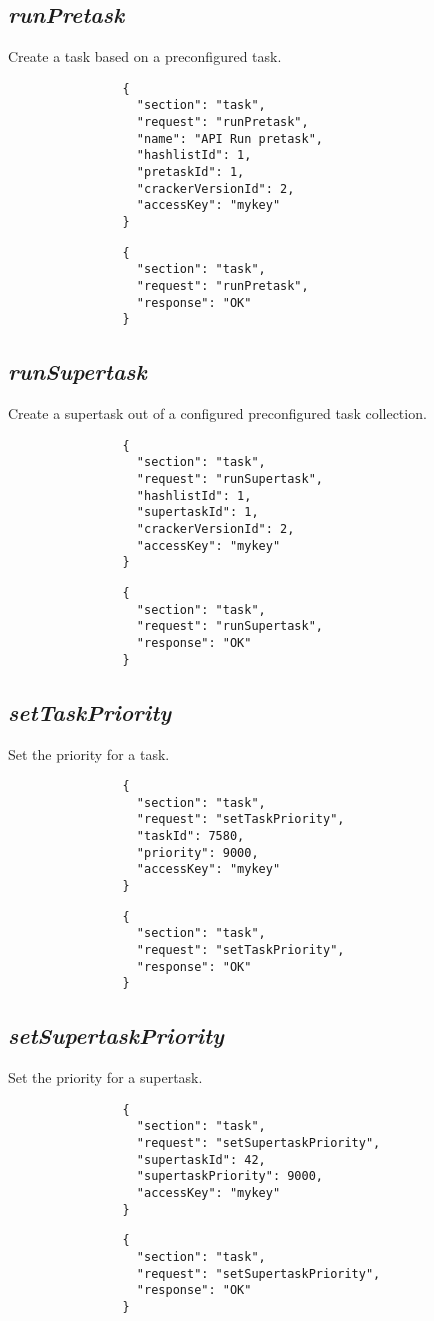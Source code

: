 		\subsection*{\textit{runPretask}}
			Create a task based on a preconfigured task.
			{
				\color{blue}
				\begin{verbatim}
				{
				  "section": "task",
				  "request": "runPretask",
				  "name": "API Run pretask",
				  "hashlistId": 1,
				  "pretaskId": 1,
				  "crackerVersionId": 2,
				  "accessKey": "mykey"
				}
				\end{verbatim}
			}
			{
				\color{OliveGreen}
				\begin{verbatim}
				{
				  "section": "task",
				  "request": "runPretask",
				  "response": "OK"
				}
				\end{verbatim}
			}		
		\subsection*{\textit{runSupertask}}
			Create a supertask out of a configured preconfigured task collection.
			{
				\color{blue}
				\begin{verbatim}
				{
				  "section": "task",
				  "request": "runSupertask",
				  "hashlistId": 1,
				  "supertaskId": 1,
				  "crackerVersionId": 2,
				  "accessKey": "mykey"
				}
				\end{verbatim}
			}
			{
				\color{OliveGreen}
				\begin{verbatim}
				{
				  "section": "task",
				  "request": "runSupertask",
				  "response": "OK"
				}
				\end{verbatim}
			}	
		\subsection*{\textit{setTaskPriority}}
			Set the priority for a task.
			{
				\color{blue}
				\begin{verbatim}
				{
				  "section": "task",
				  "request": "setTaskPriority",
				  "taskId": 7580,
				  "priority": 9000,
				  "accessKey": "mykey"
				}
				\end{verbatim}
			}
			{
				\color{OliveGreen}
				\begin{verbatim}
				{
				  "section": "task",
				  "request": "setTaskPriority",
				  "response": "OK"
				}
				\end{verbatim}
			}		
		\subsection*{\textit{setSupertaskPriority}}
			Set the priority for a supertask.
			{
				\color{blue}
				\begin{verbatim}
				{
				  "section": "task",
				  "request": "setSupertaskPriority",
				  "supertaskId": 42,
				  "supertaskPriority": 9000,
				  "accessKey": "mykey"
				}
				\end{verbatim}
			}
			{
				\color{OliveGreen}
				\begin{verbatim}
				{
				  "section": "task",
				  "request": "setSupertaskPriority",
				  "response": "OK"
				}
				\end{verbatim}
			}
